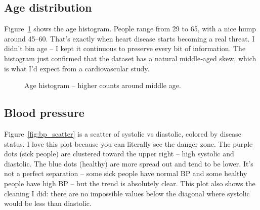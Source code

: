 \documentclass[11pt, a4paper, oneside]{book}
\begin{document}
\subsection{Age distribution}
Figure~\ref{fig:age_hist} shows the age histogram. People range from 29 to 65, with a nice hump around 45–60. That’s exactly when heart disease starts becoming a real threat. I didn’t bin age – I kept it continuous to preserve every bit of information. The histogram just confirmed that the dataset has a natural middle‑aged skew, which is what I’d expect from a cardiovascular study.

\begin{figure}[htbp]
\centering
{}
\caption{Age histogram – higher counts around middle age.}
\label{fig:age_hist}
\end{figure}

\subsection{Blood pressure}
Figure~\ref{fig:bp_scatter} is a scatter of systolic vs diastolic, colored by disease status. I love this plot because you can literally see the danger zone. The purple dots (sick people) are clustered toward the upper right – high systolic and diastolic. The blue dots (healthy) are more spread out and tend to be lower. It’s not a perfect separation – some sick people have normal BP and some healthy people have high BP – but the trend is absolutely clear. This plot also shows the cleaning I did: there are no impossible values below the diagonal where systolic would be less than diastolic.
\end{document}
